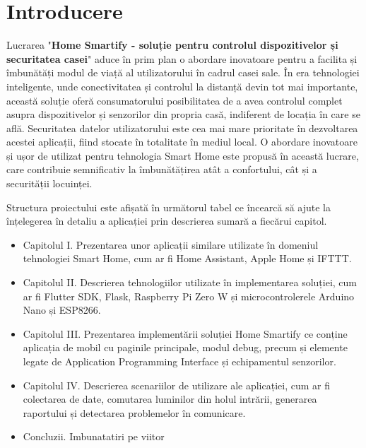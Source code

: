 \chapter*{Introducere} 

Lucrarea "\textbf{Home Smartify - soluție pentru controlul dispozitivelor și securitatea casei}" aduce în prim plan o abordare inovatoare pentru a facilita și îmbunătăți modul de viață al utilizatorului în cadrul casei sale. În era tehnologiei inteligente, unde conectivitatea și controlul la distanță devin tot mai importante, această soluție oferă consumatorului posibilitatea de a avea controlul complet asupra dispozitivelor și senzorilor din propria casă, indiferent de locația în care se află. Securitatea datelor utilizatorului este cea mai mare prioritate în dezvoltarea acestei aplicații, fiind stocate în totalitate în mediul local. O abordare inovatoare și ușor de utilizat pentru tehnologia Smart Home este propusă în această lucrare, care contribuie semnificativ la îmbunătățirea atât a confortului, cât și a securității locuinței.

Structura proiectului este afișată în următorul tabel ce încearcă să ajute la înțelegerea în detaliu a aplicației prin descrierea sumară a fiecărui capitol.

\begin{itemize}
	\item Capitolul I. Prezentarea unor aplicații similare utilizate în domeniul tehnologiei Smart Home, cum ar fi Home Assistant, Apple Home și IFTTT.
	
	\item Capitolul II. Descrierea tehnologiilor utilizate în implementarea soluției, cum ar fi Flutter SDK, Flask, Raspberry Pi Zero W și microcontrolerele Arduino Nano și ESP8266.
	
	\item Capitolul III. Prezentarea implementării soluției Home Smartify ce conține aplicația de mobil cu paginile principale, modul debug, precum și elemente legate de Application Programming Interface și
	echipamentul senzorilor.
	
	\item Capitolul IV. Descrierea scenariilor de utilizare ale aplicației, cum ar fi colectarea de date, comutarea luminilor din holul intrării, generarea raportului și detectarea problemelor în comunicare.
	
	\item Concluzii. Imbunatatiri pe viitor
\end{itemize}